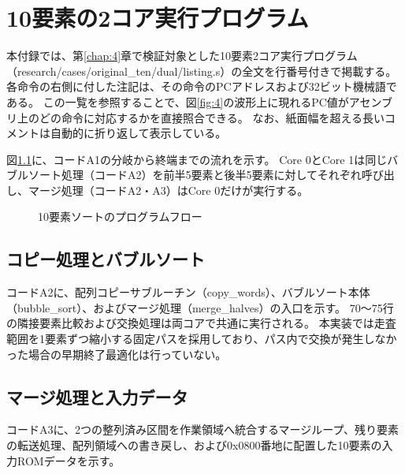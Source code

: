 \appendix

\chapter{10要素の2コア実行プログラム}\label{chap:A}

本付録では、第\ref{chap:4}章で検証対象とした10要素2コア実行プログラム（research/cases/original\_ten/dual/listing.s）の全文を行番号付きで掲載する。
各命令の右側に付した注記は、その命令のPCアドレスおよび32ビット機械語である。
この一覧を参照することで、図\ref{fig:4}の波形上に現れるPC値がアセンブリ上のどの命令に対応するかを直接照合できる。
なお、紙面幅を超える長いコメントは自動的に折り返して表示している。

図\ref{fig:appendix-sort-flow}に、コードA1の分岐から終端までの流れを示す。
Core 0とCore 1は同じバブルソート処理（コードA2）を前半5要素と後半5要素に対してそれぞれ呼び出し、マージ処理（コードA2・A3）はCore 0だけが実行する。

\begin{figure}[H]
\centering

\caption{10要素ソートのプログラムフロー}\label{fig:appendix-sort-flow}
\end{figure}

\par\medskip{}\par\nopagebreak


\section*{コピー処理とバブルソート}

コードA2に、配列コピーサブルーチン（copy\_words）、バブルソート本体（bubble\_sort）、およびマージ処理（merge\_halves）の入口を示す。
70〜75行の隣接要素比較および交換処理は両コアで共通に実行される。
本実装では走査範囲を1要素ずつ縮小する固定パスを採用しており、パス内で交換が発生しなかった場合の早期終了最適化は行っていない。

\par\medskip{}\par\nopagebreak


\clearpage
\section*{マージ処理と入力データ}

コードA3に、2つの整列済み区間を作業領域へ統合するマージループ、残り要素の転送処理、配列領域への書き戻し、および0x0800番地に配置した10要素の入力ROMデータを示す。

\par\medskip{}\par\nopagebreak

